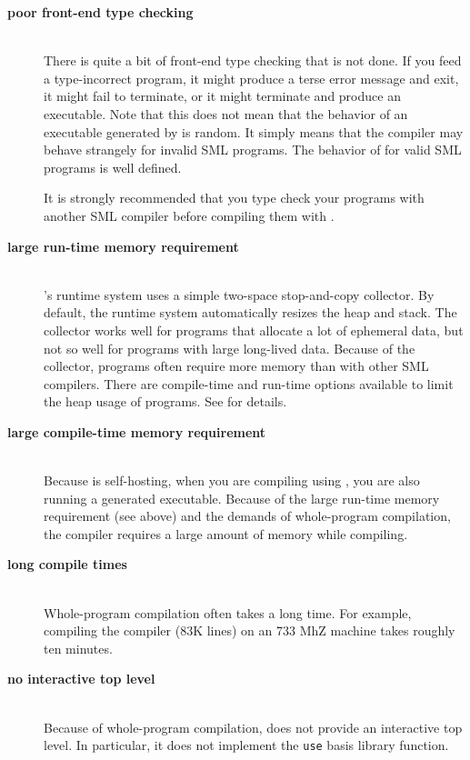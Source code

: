 
\newcommand{\drawback}[1]{\item[\bf #1]\hspace{1in}\\}

\begin{description}

\drawback{poor front-end type checking}
There is quite a bit of front-end type checking that is not done.  If
you feed {\mlton} a type-incorrect program, it might produce a terse
error message and exit, it might fail to terminate, or it might
terminate and produce an executable.  Note that this does not mean
that the behavior of an executable generated by {\mlton} is random.
It simply means that the compiler may behave strangely for invalid SML
programs.  The behavior of {\mlton} for valid SML programs is well
defined.

It is strongly recommended that you type check your programs with
another SML compiler before compiling them with {\mlton}.

\drawback{large run-time memory requirement}
{\mlton}'s runtime system uses a simple two-space stop-and-copy
collector.  By default, the runtime system automatically resizes the
heap and stack.  The collector works well for programs that allocate a
lot of ephemeral data, but not so well for programs with large
long-lived data.  Because of the collector, programs often require
more memory than with other SML compilers.  There are compile-time and
run-time options available to limit the heap usage of programs.  See
 for details.

\drawback{large compile-time memory requirement}
Because {\mlton} is self-hosting, when you are compiling using
{\mlton}, you are also running a {\mlton} generated executable.
Because of the large run-time memory requirement (see above) and the demands of
whole-program compilation, the compiler requires a large amount of memory while
compiling.

\drawback{long compile times}
Whole-program compilation often takes a long time.  For example, compiling
the compiler (83K lines) on an 733 MhZ machine takes roughly ten minutes.

\drawback{no interactive top level}
Because of whole-program compilation, {\mlton} does not provide an
interactive top level.  In particular, it does not implement the {\tt use} basis
library function.

\end{description}

